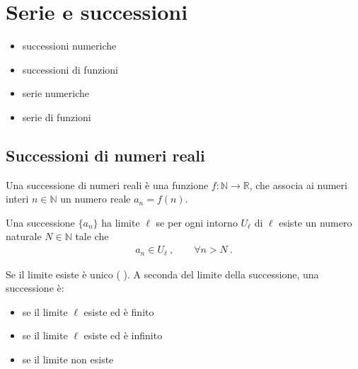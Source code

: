 \documentclass[letterpaper,10pt,italian]{jupyterBook}
\begin{document}
\chapter{Serie e successioni}
\label{\detokenize{ch/series:serie-e-successioni}}\label{\detokenize{ch/series:math-hs-series}}\label{\detokenize{ch/series::doc}}\begin{itemize}
\item {} 
\sphinxAtStartPar
successioni numeriche

\item {} 
\sphinxAtStartPar
successioni di funzioni

\item {} 
\sphinxAtStartPar
serie numeriche

\item {} 
\sphinxAtStartPar
serie di funzioni

\end{itemize}


\section{Successioni di numeri reali}
\label{\detokenize{ch/series:successioni-di-numeri-reali}}\label{\detokenize{ch/series:math-hs-series-real-sequences}}
\sphinxAtStartPar
{} Una successione di numeri reali è una funzione \(f: \mathbb{N} \rightarrow \mathbb{R}\), che associa ai numeri interi \(n \in \mathbb{N}\) un numero reale \(a_n = f(n)\).

\sphinxAtStartPar
{} Una successione \(\{ a_n \}\) ha limite \(\ell\) se per ogni intorno \(U_{\ell}\) di \(\ell\) esiste un numero naturale \(N \in \mathbb{N}\) tale che
\begin{equation*}
\begin{split}a_n \in U_{\ell} \ , \qquad \forall n > N \ .\end{split}
\end{equation*}
\sphinxAtStartPar
{} 

\sphinxAtStartPar
Se il limite esiste è unico ( ). A seconda del limite della successione, una successione è:
\begin{itemize}
\item {} 
\sphinxAtStartPar
{} se il limite \(\ell\) esiste ed è finito

\item {} 
\sphinxAtStartPar
{} se il limite \(\ell\) esiste ed è infinito

\item {} 
\sphinxAtStartPar
{} se il limite non esiste

\end{itemize}
\end{document}
